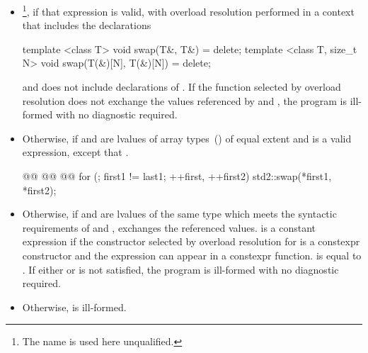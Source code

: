 \begin{itemize}
\item
  \footnote{The name  is used here unqualified.},
  if that expression is valid, with overload resolution performed in a context
  that includes the declarations
\begin{codeblock}
  template <class T>
  void swap(T&, T&) = delete;
  template <class T, size_t N>
  void swap(T(&)[N], T(&)[N]) = delete;
\end{codeblock}
  and does not include declarations of 
  .
  If the function selected by overload resolution does not
  exchange the values referenced by  and ,
  the program is ill-formed with no diagnostic required.

\item
  Otherwise, 
  if  and  are lvalues of array types~()
  of equal extent and 
  is a valid expression, except that
  .
  \begin{codeblock}
  @@
    @@
      @@
  {
    for (; first1 != last1; ++first, ++first2) {
      std2::swap(*first1, *first2);
    }
  }
  \end{codeblock}

\item
  Otherwise, if  and  are lvalues of the
  same type  which meets the syntactic requirements of
   and
  , exchanges the referenced values.
   is a constant expression if
  the constructor selected by overload resolution for
   is a constexpr constructor and
  the expression  can appear in a
  constexpr function. 
  is equal to . If either
   or
   is not satisfied, the program
  is ill-formed with no diagnostic required.

\item
  Otherwise,  is ill-formed.
\end{itemize}

